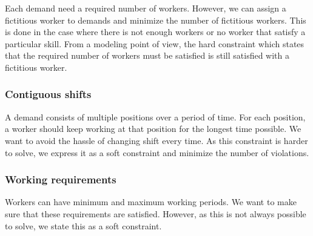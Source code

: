 \documentclass[../thesis.tex]{subfiles}
\begin{document}
Each demand need a required number of workers. However, we can assign a fictitious worker to demands 
and minimize the number of fictitious workers. This is done in the case where there is not enough workers
or no worker that satisfy a particular skill. From a modeling point of view, the hard constraint which states
that the required number of workers must be satisfied is still satisfied with a fictitious worker.

\subsubsection{Contiguous shifts}

A demand consists of multiple positions over a period of time. 
For each position, a worker should keep working at that position for the longest time possible. 
We want to avoid the hassle of changing shift every time. 
As this constraint is harder to solve, we express it as a soft constraint and minimize the number of 
violations.

\subsubsection{Working requirements}

Workers can have minimum and maximum working periods. We want to make sure 
that these requirements are satisfied. However, as this is not always possible to solve, we 
state this as a soft constraint.
\end{document}
